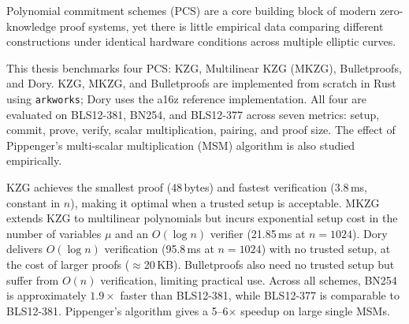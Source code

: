 \begin{Abstract}

Polynomial commitment schemes (PCS) are a core building block of
modern zero-knowledge proof systems, yet there is little empirical
data comparing different constructions under identical hardware
conditions across multiple elliptic curves.

This thesis benchmarks four PCS: KZG, Multilinear KZG (MKZG),
Bulletproofs, and Dory. KZG, MKZG, and Bulletproofs are implemented
from scratch in Rust using \texttt{arkworks}; Dory uses the a16z
reference implementation. All four are evaluated on BLS12-381, BN254,
and BLS12-377 across seven metrics: setup, commit, prove, verify,
scalar multiplication, pairing, and proof size. The effect of
Pippenger's multi-scalar multiplication (MSM) algorithm is also
studied empirically.

KZG achieves the smallest proof (48\,bytes) and fastest verification
(3.8\,ms, constant in $n$), making it optimal when a trusted setup is
acceptable. MKZG extends KZG to multilinear polynomials but incurs
exponential setup cost in the number of variables $\mu$ and an
$O(\log n)$ verifier (21.85\,ms at $n=1024$). Dory delivers
$O(\log n)$ verification (95.8\,ms at $n=1024$) with no trusted
setup, at the cost of larger proofs ($\approx$20\,KB). Bulletproofs
also need no trusted setup but suffer from $O(n)$ verification,
limiting practical use. Across all schemes, BN254 is approximately
$1.9\times$ faster than BLS12-381, while BLS12-377 is comparable to
BLS12-381. Pippenger's algorithm gives a 5--6$\times$ speedup on
large single MSMs.

\end{Abstract}

